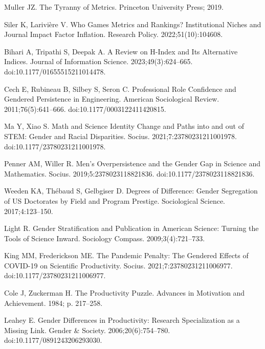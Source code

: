 \documentclass[
  10pt,
  letterpaper,
]{article}
\begin{document}
\begin{thebibliography}{10}
Muller JZ.
\newblock The Tyranny of Metrics.
\newblock Princeton University Press; 2019.

Siler K, Larivi{\`e}re V.
\newblock Who Games Metrics and Rankings? {{Institutional}} Niches and Journal Impact Factor Inflation.
\newblock Research Policy. 2022;51(10):104608.

Bihari A, Tripathi S, Deepak A.
\newblock A Review on H-Index and Its Alternative Indices.
\newblock Journal of Information Science. 2023;49(3):624--665.
\newblock doi:{10.1177/01655515211014478}.

Cech E, Rubineau B, Silbey S, Seron C.
\newblock Professional {{Role Confidence}} and {{Gendered Persistence}} in {{Engineering}}.
\newblock American Sociological Review. 2011;76(5):641--666.
\newblock doi:{10.1177/0003122411420815}.

Ma Y, Xiao S.
\newblock Math and {{Science Identity Change}} and {{Paths}} into and out of {{STEM}}: {{Gender}} and {{Racial Disparities}}.
\newblock Socius. 2021;7:23780231211001978.
\newblock doi:{10.1177/23780231211001978}.

Penner AM, Willer R.
\newblock Men's {{Overpersistence}} and the {{Gender Gap}} in {{Science}} and {{Mathematics}}.
\newblock Socius. 2019;5:2378023118821836.
\newblock doi:{10.1177/2378023118821836}.

Weeden KA, Th{\'e}baud S, Gelbgiser D.
\newblock Degrees of Difference: {{Gender}} Segregation of {{US}} Doctorates by Field and Program Prestige.
\newblock Sociological Science. 2017;4:123--150.

Light R.
\newblock Gender Stratification and Publication in {{American}} Science: {{Turning}} the Tools of Science Inward.
\newblock Sociology Compass. 2009;3(4):721--733.

King MM, Frederickson ME.
\newblock The {{Pandemic Penalty}}: {{The Gendered Effects}} of {{COVID-19}} on {{Scientific Productivity}}.
\newblock Socius. 2021;7:23780231211006977.
\newblock doi:{10.1177/23780231211006977}.

Cole J, Zuckerman H.
\newblock The {{Productivity Puzzle}}.
\newblock Advances in Motivation and Achievement. 1984; p. 217--258.

Leahey E.
\newblock Gender {{Differences}} in {{Productivity}}: {{Research Specialization}} as a {{Missing Link}}.
\newblock Gender \& Society. 2006;20(6):754--780.
\newblock doi:{10.1177/0891243206293030}.


\end{thebibliography}
\end{document}
